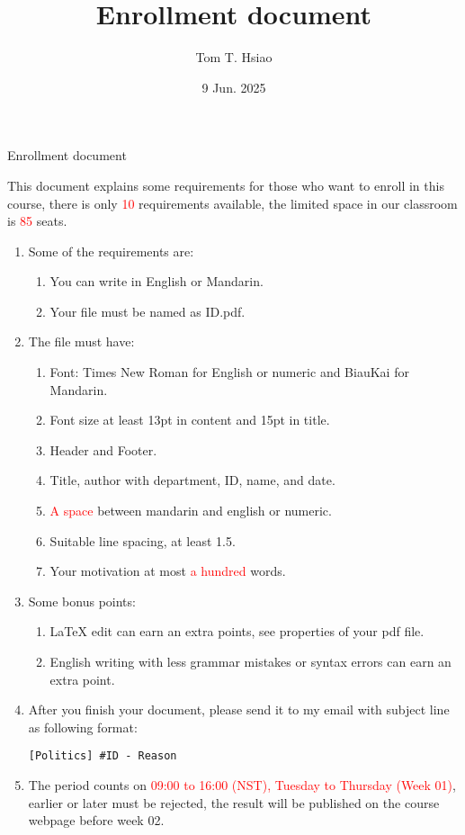 \documentclass{article}
\title{Enrollment document}
\author{Tom T. Hsiao}
\date{9 Jun. 2025}
\begin{document}
\thispagestyle{fancy}
\begin{center}
\fontsize{16pt}{16pt}\selectfont Enrollment document
\end{center}
\fontsize{14pt}{14pt}\selectfont
This document explains some requirements for those who want to enroll in this course, there is only \textcolor{red}{10} requirements available, the limited space in our classroom is \textcolor{red}{85} seats. \\
\begin{enumerate}
\item Some of the requirements are:
\begin{enumerate}
\item You can write in English or Mandarin.
\item Your file must be named as ID.pdf.
\end{enumerate}
\item The file must have:
\begin{enumerate}
\item Font: Times New Roman for English or numeric and BiauKai for Mandarin.
\item Font size at least 13pt in content and 15pt in title.
\item Header and Footer.
\item Title, author with department, ID, name, and date.
\item \textcolor{red}{A space} between mandarin and english or numeric.
\item Suitable line spacing, at least 1.5.
\item Your motivation at most \textcolor{red}{a hundred} words.
\end{enumerate}
\item Some bonus points:
\begin{enumerate}
\item LaTeX edit can earn an extra points, see properties of your pdf file.
\item English writing with less grammar mistakes or syntax errors can earn an extra point.
\end{enumerate}
\item After you finish your document, please send it to my email with subject line as following format:
\begin{verbatim}
[Politics] #ID - Reason
\end{verbatim}
\item The period counts on \textcolor{red}{09:00 to 16:00 (NST), Tuesday to Thursday (Week 01)}, earlier or later must be rejected, the result will be published on the course webpage before week 02.
\end{enumerate}
\end{document}
